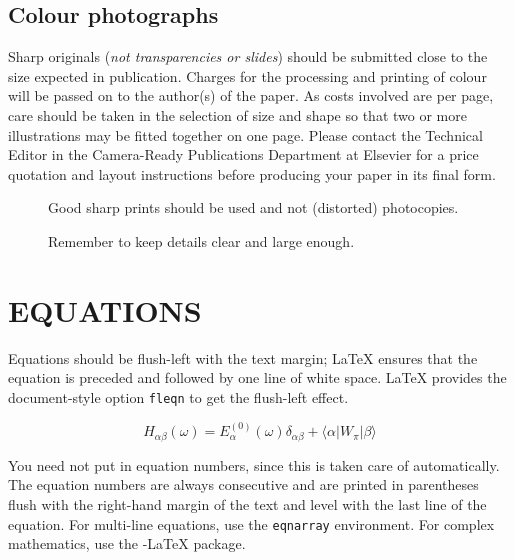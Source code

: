 \subsection{Colour photographs}

Sharp originals ({\em not transparencies or slides\/}) should be
submitted close to the size expected in publication. Charges for the
processing and printing of colour will be passed on to the author(s) of
the paper. As costs involved are per page, care should be taken in the
selection of size and shape so that two or more illustrations may be
fitted together on one page. Please contact the Technical Editor in the
Camera-Ready Publications Department at Elsevier for a price quotation
and layout instructions before producing your paper in its final form.

\begin{figure}[htb]
\vspace{9pt}
\framebox[55mm]{\rule[-21mm]{0mm}{43mm}}
\caption{Good sharp prints should be used and not (distorted) photocopies.}
\label{fig:largenenough}
\end{figure}
%
\begin{figure}[htb]
\framebox[55mm]{\rule[-21mm]{0mm}{43mm}}
\caption{Remember to keep details clear and large enough.}
\label{fig:toosmall}
\end{figure}

\section{EQUATIONS}

Equations should be flush-left with the text margin; \LaTeX{} ensures
that the equation is preceded and followed by one line of white space. 
\LaTeX{} provides the document-style option {\tt fleqn} to get the
flush-left effect.

\begin{equation}
H_{\alpha\beta}(\omega) = E_\alpha^{(0)}(\omega) \delta_{\alpha\beta} +
                          \langle \alpha | W_\pi | \beta \rangle 
\end{equation}

You need not put in equation numbers, since this is taken care of
automatically. The equation numbers are always consecutive and are
printed in parentheses flush with the right-hand margin of the text and
level with the last line of the equation. For multi-line equations, use
the {\tt eqnarray} environment. For complex mathematics, use the
\AmS-\LaTeX{} package.

